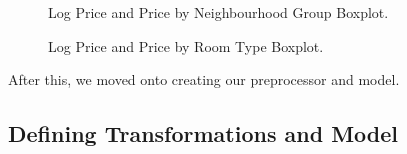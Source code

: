\documentclass[
  letterpaper,
  DIV=11,
  numbers=noendperiod]{scrartcl}
\begin{document}
\begin{figure}[H]


\caption{\label{fig-neighbourhood-plot}Log Price and Price by
Neighbourhood Group Boxplot.}

\end{figure}%

\begin{figure}[H]


\caption{\label{fig-room-type-plot}Log Price and Price by Room Type
Boxplot.}

\end{figure}%

After this, we moved onto creating our preprocessor and model.

\subsection{Defining Transformations and
Model}\label{defining-transformations-and-model}
\end{document}
